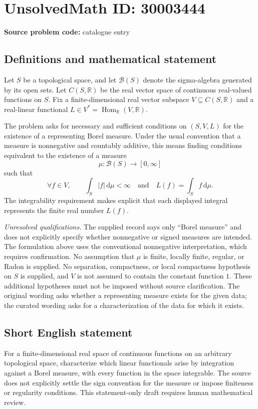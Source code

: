 \documentclass[11pt]{article}
\newcommand{\R}{\mathbb{R}}
\begin{document}
\section*{UnsolvedMath ID: 30003444}
\textbf{Source problem code:} catalogue entry
\subsection{Definitions and mathematical statement}
Let \(S\) be a topological space, and let \(\mathcal B(S)\) denote the sigma-algebra generated by its open sets. Let \(C(S,\R)\) be the real vector space of continuous real-valued functions on \(S\). Fix a finite-dimensional real vector subspace \(V\subseteq C(S,\R)\) and a real-linear functional \(L\in V^*=\operatorname{Hom}_{\R}(V,\R)\).

The problem asks for necessary and sufficient conditions on \((S,V,L)\) for the existence of a representing Borel measure. Under the usual convention that a measure is nonnegative and countably additive, this means finding conditions equivalent to the existence of a measure
\[
\mu:\mathcal B(S)\longrightarrow[0,\infty]
\]
such that
\[
\forall f\in V,\qquad \int_S |f|\,\mathrm d\mu<\infty
\quad\text{and}\quad
L(f)=\int_S f\,\mathrm d\mu.
\]
The integrability requirement makes explicit that each displayed integral represents the finite real number \(L(f)\).

\textit{Unresolved qualifications.} The supplied record says only ``Borel measure'' and does not explicitly specify whether nonnegative or signed measures are intended. The formulation above uses the conventional nonnegative interpretation, which requires confirmation. No assumption that \(\mu\) is finite, locally finite, regular, or Radon is supplied. No separation, compactness, or local compactness hypothesis on \(S\) is supplied, and \(V\) is not assumed to contain the constant function \(1\). These additional hypotheses must not be imposed without source clarification. The original wording asks whether a representing measure exists for the given data; the curated wording asks for a characterization of the data for which it exists.
\subsection{Short English statement}
For a finite-dimensional real space of continuous functions on an arbitrary topological space, characterize which linear functionals arise by integration against a Borel measure, with every function in the space integrable. The source does not explicitly settle the sign convention for the measure or impose finiteness or regularity conditions. This statement-only draft requires human mathematical review.
\end{document}
